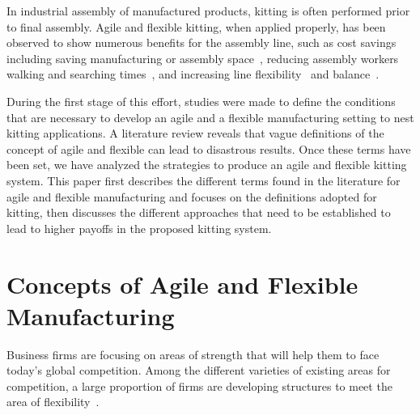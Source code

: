\documentclass[final,3p,12pt]{elsarticle}
\begin{document}
In industrial assembly of manufactured products, kitting is often performed prior to final assembly. Agile and flexible kitting, when applied properly, has been observed to show numerous benefits for the assembly line, such as cost savings~\cite{Carlsson_2008} including saving manufacturing or assembly space~\cite{Medbo2003}, reducing assembly workers walking and searching times~\cite{Schwind1992}, and increasing line flexibility~\cite{Bozer1992} and balance~\cite{Jiao2000}.
%

During the first stage of this effort, studies were made to define the conditions that are necessary to develop an agile and a flexible manufacturing setting to nest kitting applications. A literature review reveals that vague definitions of the concept of agile and flexible can lead to disastrous results. Once these terms have been set, we have analyzed the strategies to produce an agile and flexible kitting system. This paper first describes the different terms found in the literature for agile and flexible manufacturing and focuses on the definitions adopted for kitting, then discusses the different approaches that need to be established to lead to higher payoffs in the proposed kitting system.


\section{Concepts of Agile and Flexible Manufacturing}
\label{Sect:AgilityFlexibility}

Business firms are focusing on areas of strength that will help them to face today's global competition. Among the different varieties of existing areas for competition, a large proportion of firms are developing structures to meet the area of flexibility~\cite{Jaikumar.HBR.1986,Dertouzos.MIT.1990}.
\end{document}
